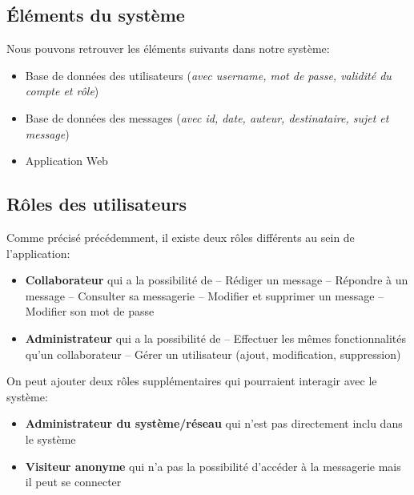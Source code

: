 \documentclass[a4paper,10pt]{article}
\begin{document}
    \subsection*{Éléments du système}
    Nous pouvons retrouver les éléments suivants dans notre système: 
    \begin{onehalfspacing}
    \begin{itemize}
    \item Base de données des utilisateurs (\textit{avec username, mot de passe, validité du compte et rôle})
    \item Base de données des messages (\textit{avec id, date, auteur, destinataire, sujet et message})
    \item Application Web
    \end{itemize}
    \end{onehalfspacing}
    \subsection*{Rôles des utilisateurs}
    Comme précisé précédemment, il existe deux rôles différents au sein de l’application:
    \begin{onehalfspacing}
    \begin{itemize}
    \item \textbf{Collaborateur} qui a la possibilité de
    \subitem-- Rédiger un message
    \subitem-- Répondre à un message
    \subitem-- Consulter sa messagerie
    \subitem-- Modifier et supprimer un message
    \subitem-- Modifier son mot de passe
    \item \textbf{Administrateur} qui a la possibilité de
    \subitem-- Effectuer les mêmes fonctionnalités qu’un collaborateur
    \subitem-- Gérer un utilisateur (ajout, modification, suppression)  \\
    \end{itemize}
    \end{onehalfspacing}
    On peut ajouter deux rôles supplémentaires qui pourraient interagir avec le système:
    \begin{onehalfspacing}
    \begin{itemize}
    \item \textbf{Administrateur du système/réseau} qui n’est pas directement inclu dans le système
    \item \textbf{Visiteur anonyme} qui n’a pas la possibilité d’accéder à la messagerie mais il peut se connecter
    \end{itemize}
    \end{onehalfspacing}
\end{document}
